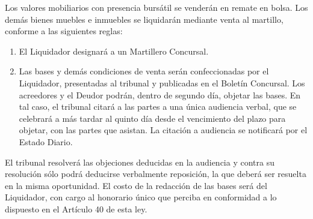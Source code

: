 \documentclass[
]{book}
\begin{document}
Los valores mobiliarios con presencia bursátil se venderán en remate en bolsa. Los demás bienes muebles e inmuebles se liquidarán mediante venta al martillo, conforme a las siguientes reglas:

\begin{enumerate}
\def\labelenumi{\alph{enumi})}
\item
  El Liquidador designará a un Martillero Concursal.
\item
  Las bases y demás condiciones de venta serán confeccionadas por el Liquidador, presentadas al tribunal y publicadas en el Boletín Concursal. Los acreedores y el Deudor podrán, dentro de segundo día, objetar las bases. En tal caso, el tribunal citará a las partes a una única audiencia verbal, que se celebrará a más tardar al quinto día desde el vencimiento del plazo para objetar, con las partes que asistan. La citación a audiencia se notificará por el Estado Diario.
\end{enumerate}

El tribunal resolverá las objeciones deducidas en la audiencia y contra su resolución sólo podrá deducirse verbalmente reposición, la que deberá ser resuelta en la misma oportunidad.
El costo de la redacción de las bases será del Liquidador, con cargo al honorario único que perciba en conformidad a lo dispuesto en el Artículo 40 de esta ley.
\end{document}
